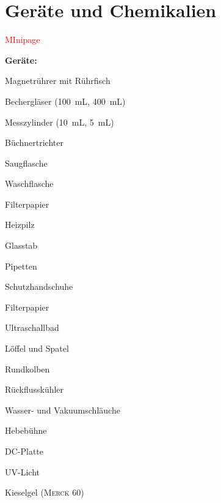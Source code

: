 \section{Geräte und Chemikalien}
\label{sec:geraete}

\textcolor{red}{MInipage}

\textbf{Geräte:}
\begin{itemize}
	\begin{minipage}{0.5\textwidth}
		\item Magnetrührer mit Rührfisch
		\item Bechergläser (\SI{100}{\milli \liter}, \SI{400}{\milli \liter})
		\item Messzylinder (\SI{10}{\milli \liter}, \SI{5}{\milli \liter})
		\item Büchnertrichter
		\item Saugflasche
		\item Waschflasche
		\item Filterpapier
		\item Heizpilz
		\item Glasstab
		\item Pipetten
		\item Schutzhandschuhe
	\end{minipage}
	\begin{minipage}{0.5\textwidth}
		\item Filterpapier
		\item Ultraschallbad
		\item Löffel und Spatel
		\item Rundkolben
		\item Rückflusskühler
		\item Wasser- und Vakuumschläuche
		\item Hebebühne
		\item DC-Platte
		\item UV-Licht
		\item Kieselgel (\textsc{Merck} 60)
	\end{minipage}
\end{itemize}

\newpage

